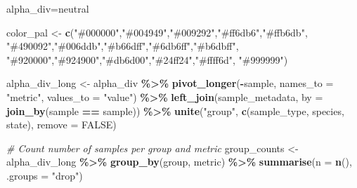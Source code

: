 \documentclass[
]{book}
\newenvironment{Shaded}{\begin{snugshade}}{\end{snugshade}}
\newcommand{\AttributeTok}[1]{\textcolor[rgb]{0.13,0.29,0.53}{#1}}
\newcommand{\CommentTok}[1]{\textcolor[rgb]{0.56,0.35,0.01}{\textit{#1}}}
\newcommand{\ConstantTok}[1]{\textcolor[rgb]{0.56,0.35,0.01}{#1}}
\newcommand{\FunctionTok}[1]{\textcolor[rgb]{0.13,0.29,0.53}{\textbf{#1}}}
\newcommand{\NormalTok}[1]{#1}
\newcommand{\OtherTok}[1]{\textcolor[rgb]{0.56,0.35,0.01}{#1}}
\newcommand{\SpecialCharTok}[1]{\textcolor[rgb]{0.81,0.36,0.00}{\textbf{#1}}}
\newcommand{\StringTok}[1]{\textcolor[rgb]{0.31,0.60,0.02}{#1}}
\begin{document}
\begin{Shaded}
\begin{Highlighting}[]
\NormalTok{alpha\_div}\OtherTok{=}\NormalTok{neutral}

\NormalTok{color\_pal }\OtherTok{\textless{}{-}} \FunctionTok{c}\NormalTok{(}\StringTok{"\#000000"}\NormalTok{,}\StringTok{"\#004949"}\NormalTok{,}\StringTok{"\#009292"}\NormalTok{,}\StringTok{"\#ff6db6"}\NormalTok{,}\StringTok{"\#ffb6db"}\NormalTok{,}
 \StringTok{"\#490092"}\NormalTok{,}\StringTok{"\#006ddb"}\NormalTok{,}\StringTok{"\#b66dff"}\NormalTok{,}\StringTok{"\#6db6ff"}\NormalTok{,}\StringTok{"\#b6dbff"}\NormalTok{,}
 \StringTok{"\#920000"}\NormalTok{,}\StringTok{"\#924900"}\NormalTok{,}\StringTok{"\#db6d00"}\NormalTok{,}\StringTok{"\#24ff24"}\NormalTok{,}\StringTok{"\#ffff6d"}\NormalTok{, }\StringTok{"\#999999"}\NormalTok{)}

\NormalTok{alpha\_div\_long }\OtherTok{\textless{}{-}}\NormalTok{ alpha\_div }\SpecialCharTok{\%\textgreater{}\%}
  \FunctionTok{pivot\_longer}\NormalTok{(}\SpecialCharTok{{-}}\NormalTok{sample, }\AttributeTok{names\_to =} \StringTok{"metric"}\NormalTok{, }\AttributeTok{values\_to =} \StringTok{"value"}\NormalTok{) }\SpecialCharTok{\%\textgreater{}\%}
  \FunctionTok{left\_join}\NormalTok{(sample\_metadata, }\AttributeTok{by =} \FunctionTok{join\_by}\NormalTok{(sample }\SpecialCharTok{==}\NormalTok{ sample)) }\SpecialCharTok{\%\textgreater{}\%}
  \FunctionTok{unite}\NormalTok{(}\StringTok{"group"}\NormalTok{, }\FunctionTok{c}\NormalTok{(sample\_type, species, state), }\AttributeTok{remove =} \ConstantTok{FALSE}\NormalTok{)}

\CommentTok{\# Count number of samples per group and metric}
\NormalTok{group\_counts }\OtherTok{\textless{}{-}}\NormalTok{ alpha\_div\_long }\SpecialCharTok{\%\textgreater{}\%}
  \FunctionTok{group\_by}\NormalTok{(group, metric) }\SpecialCharTok{\%\textgreater{}\%}
  \FunctionTok{summarise}\NormalTok{(}\AttributeTok{n =} \FunctionTok{n}\NormalTok{(), }\AttributeTok{.groups =} \StringTok{"drop"}\NormalTok{)}


\end{Highlighting}
\end{Shaded}
\end{document}
